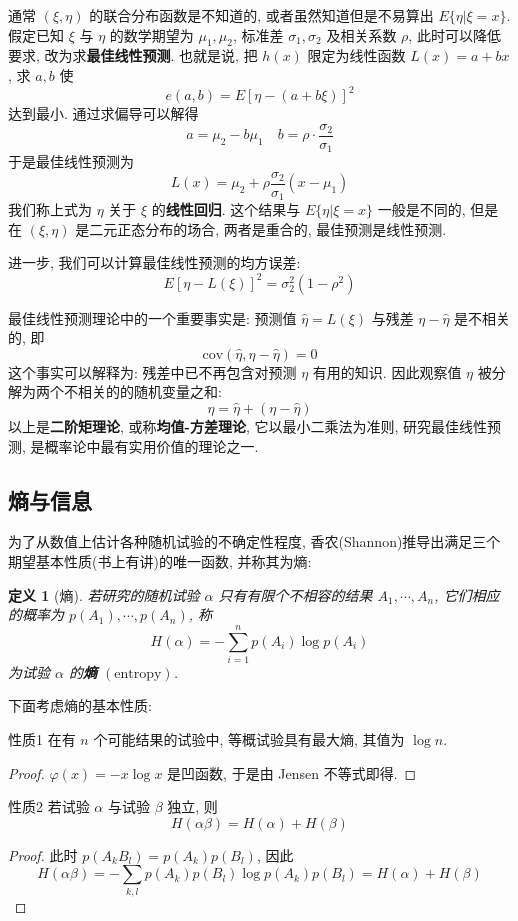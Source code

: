 \documentclass[12pt,a4paper]{article}
\newtheorem{definition}{定义}[subsection] %
\begin{document}
通常 $(\xi, \eta)$ 的联合分布函数是不知道的, 或者虽然知道但是不易算出 $E\{\eta | \xi = x\}$. 假定已知 $\xi$ 与 $\eta$ 的数学期望为 $\mu_1, \mu_2$, 
标准差 $\sigma_1, \sigma_2$ 及相关系数 $\rho$, 此时可以降低要求, 改为求\textbf{最佳线性预测}. 也就是说, 把 $h(x)$ 限定为线性函数 $L(x) = a + bx$, 求 $a, b$ 使 
\[e(a,b) = E[\eta - (a+b\xi)]^2\] 达到最小. 通过求偏导可以解得 \[ a=\mu_2 - b\mu_1 \quad b = \rho \cdot \frac{\sigma_2}{\sigma_1}\]
于是最佳线性预测为 \[ L(x) = \mu_2 + \rho \frac{\sigma_2}{\sigma_1}(x-\mu_1)\] 
我们称上式为 $\eta$ 关于 $\xi$ 的\textbf{线性回归}. 这个结果与 $E\{\eta | \xi = x\}$ 一般是不同的, 但是在 $(\xi, \eta)$ 是二元正态分布的场合, 两者是重合的, 最佳预测是线性预测. 

进一步, 我们可以计算最佳线性预测的均方误差:\[ E[\eta - L(\xi)]^2 = \sigma_2^2 (1-\rho^2)\]

最佳线性预测理论中的一个重要事实是: 预测值 $\hat{\eta} = L(\xi)$ 与残差 $\eta - \hat{\eta}$ 是不相关的, 即
\[\mathrm{cov}(\hat{\eta}, \eta - \hat{\eta}) = 0\] 这个事实可以解释为: 残差中已不再包含对预测 $\eta$ 有用的知识. 因此观察值 $\eta$ 被分解为两个不相关的的随机变量之和:
\[\eta = \hat{\eta} + (\eta - \hat{\eta})\]
以上是\textbf{二阶矩理论}, 或称\textbf{均值-方差理论}, 它以最小二乘法为准则, 研究最佳线性预测, 是概率论中最有实用价值的理论之一.

\subsection{熵与信息}
为了从数值上估计各种随机试验的不确定性程度, 香农(Shannon)推导出满足三个期望基本性质(书上有讲)的唯一函数, 并称其为熵:
\begin{definition}[熵]
    若研究的随机试验 $\alpha$ 只有有限个不相容的结果 $A_1, \cdots, A_n$, 它们相应的概率为 $p(A_1), \cdots, p(A_n)$, 称 
    \[H(\alpha) = - \sum\limits_{i=1}^n p(A_i) \log p(A_i)\] 为试验 $\alpha$ 的\textbf{熵} $(\mathrm{entropy})$.
\end{definition}

下面考虑熵的基本性质:

性质1 在有 $n$ 个可能结果的试验中, 等概试验具有最大熵, 其值为 $\log n$.
\begin{proof}
$\varphi(x) = -x\log x$ 是凹函数, 于是由 Jensen 不等式即得.
\end{proof}
性质2 若试验 $\alpha$ 与试验 $\beta$ 独立, 则 \[H(\alpha \beta) = H(\alpha) + H(\beta)\] 
\begin{proof}
    此时 $p(A_k B_l) = p(A_k)p(B_l)$, 因此
    \[H(\alpha \beta) = - \sum\limits_{k,l} p(A_k)p(B_l) \log p(A_k)p(B_l) = H(\alpha) + H(\beta)\]
\end{proof}
\end{document}
